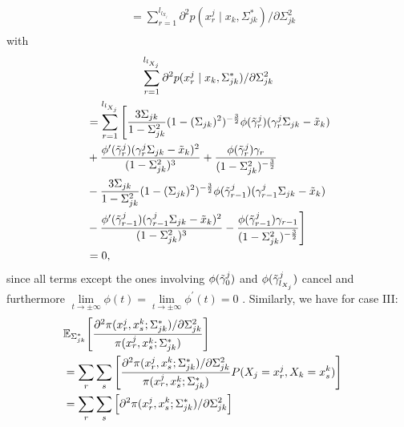 \begin{condition}
\begin{condition}
\begin{multline*}
\begin{aligned}
                &= \sum_{r=1}^{l_{l_{X_j}}} \partial^2 p(x^j_{r} \mid x_{k}, \Sigma_{jk}^*)/\partial \Sigma_{jk}^{2}
                \end{aligned}
        \end{multline*}
        with 
        \begin{multline*}
                \sum_{r=1}^{l_{l_{X_j}}} \partial^2 p(x^j_{r} \mid x_{k}, \Sigma_{jk}^*)/\partial \Sigma_{jk}^{2}\\
                \begin{aligned}
                &=\sum_{r=1}^{l_{l_{X_j}}} \Bigg[ \frac{3\Sigma_{jk}}{1-\Sigma_{jk}^2} (1-(\Sigma_{jk})^2)^{-\frac{3}{2}} \phi({\Tilde{\gamma}}^j_{r})({\gamma}^j_r\Sigma_{jk} - {\Tilde{x}}_{k}) \\
                &+ \frac{\phi^\prime({\Tilde{\gamma}}^j_{r})({\gamma}^j_r\Sigma_{jk} - {\Tilde{x}}_{k})^2}{(1-\Sigma_{jk}^2)^3} + \frac{\phi({\Tilde{\gamma}}^j_{r}){\gamma}_{r}}{(1-\Sigma_{jk}^2)^{-\frac{3}{2}}} \\
                &- \frac{3\Sigma_{jk}}{1-\Sigma_{jk}^2} (1-(\Sigma_{jk})^2)^{-\frac{3}{2}} \phi({\Tilde{\gamma}}^j_{r-1})({\gamma}^j_{r-1}\Sigma_{jk} - {\Tilde{x}}_{k}) \\
                &- \frac{\phi^\prime({\Tilde{\gamma}}^j_{r-1})({\gamma}^j_{r-1}\Sigma_{jk} - {\Tilde{x}}_{k})^2}{(1-\Sigma_{jk}^2)^3} - \frac{\phi({\Tilde{\gamma}}^j_{r-1}){\gamma}_{r-1}}{(1-\Sigma_{jk}^2)^{-\frac{3}{2}}}\Bigg] \\
                &= 0,
                \end{aligned}
        \end{multline*}
        since all terms except the ones involving $\phi({\Tilde{\gamma}}^j_{0})$ and $\phi({\Tilde{\gamma}}^j_{l_{X_j}})$ cancel and furthermore $ \lim\limits_{t \to \pm \infty} \phi(t) = \lim\limits_{t \to \pm \infty} \phi^\prime(t) = 0$ . Similarly, we have for case III:
        \begin{equation*}
            \begin{split}
                \lefteqn{\mathbb{E}_{\Sigma_{jk}^*}\Bigg[\frac{\partial^2 \pi(x^j_{r},x^k_{s}; \Sigma_{jk}^*)/\partial \Sigma_{jk}^{2}}{\pi(x^j_{r},x^k_{s}; \Sigma_{jk}^*)}\Bigg]} \\
                &= \sum_r \sum_s \Bigg[\frac{\partial^2 \pi(x^j_{r},x^k_{s}; \Sigma_{jk}^*)/\partial \Sigma_{jk}^{2}}{\pi(x^j_{r},x^k_{s}; \Sigma_{jk}^*)} P(X_j = x_r^j, X_k = x_s^k)\Bigg] \\
                &= \sum_r\sum_s \Big[\partial^2 \pi(x^j_{r},x^k_{s}; \Sigma_{jk}^*)/\partial \Sigma_{jk}^{2}\Big] \\

\end{split}
\end{equation*}
\end{condition}
\end{condition}
